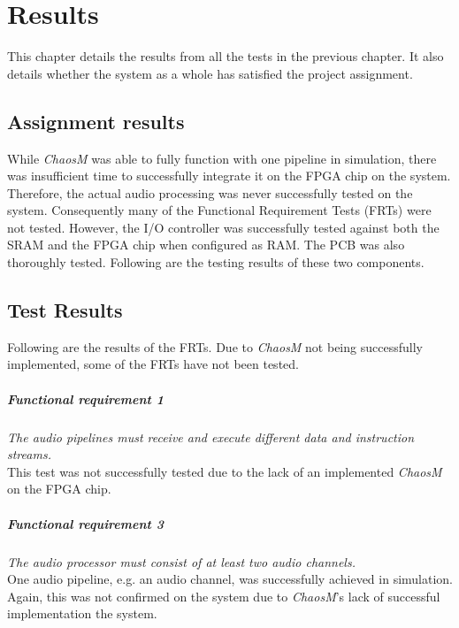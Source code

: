 \chapter{Results}\label{chapter:results}

This chapter details the results from all the tests in the previous chapter. It
also details whether the system as a whole has satisfied the project assignment.

\clearpage
\section{Assignment results}

While \textit{ChaosM} was able to fully function with one pipeline in
simulation, there was insufficient time to successfully integrate it on the FPGA
chip on the system. Therefore, the actual audio processing was never
successfully tested on the system. Consequently many of the Functional
Requirement Tests (FRTs) were not tested. However, the I/O controller was
successfully tested against both the SRAM and the FPGA chip when configured as
RAM. The PCB was also thoroughly tested. Following are the testing results of
these two components.




\clearpage
\section{Test Results}
Following are the results of the FRTs. Due to \textit{ChaosM} not being successfully implemented, some of the FRTs have not been tested.

\paragraph{Functional requirement 1}
\textit{The audio pipelines must receive and execute different data and instruction streams.}\\
This test was not successfully tested due to the lack of an implemented \textit{ChaosM} on the FPGA chip.

\paragraph{Functional requirement 3}
\textit{The audio processor must consist of at least two audio channels.}\\
One audio pipeline, e.g. an audio channel, was successfully achieved in simulation. Again, this was not confirmed on the system due to \textit{ChaosM}'s lack of successful implementation the system.

